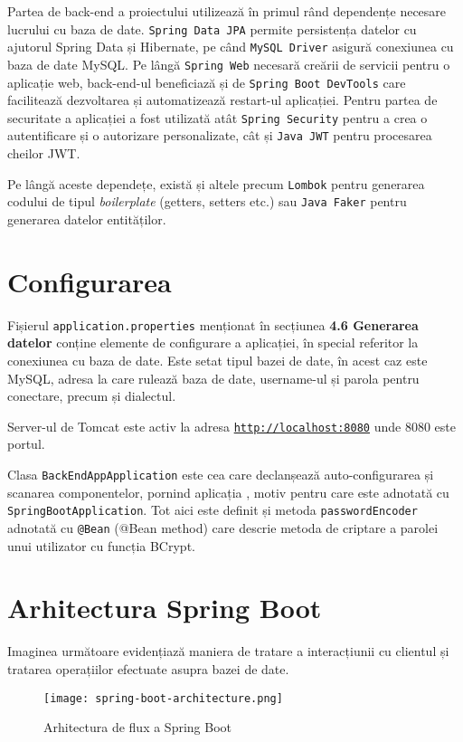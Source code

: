 Partea de back-end a proiectului \thesistitle{} utilizează în primul rând dependențe necesare lucrului cu baza de date. \texttt{Spring Data JPA} permite persistența datelor cu ajutorul Spring Data și Hibernate, pe când \texttt{MySQL Driver} asigură conexiunea cu baza de date MySQL. Pe lângă \texttt{Spring Web} necesară creării de servicii pentru o aplicație web, back-end-ul beneficiază și de \texttt{Spring Boot DevTools} care facilitează dezvoltarea și automatizează restart-ul aplicației. Pentru partea de securitate a aplicației a fost utilizată atât \texttt{Spring Security} pentru a crea o autentificare și o autorizare personalizate, cât și \texttt{Java JWT} pentru procesarea cheilor JWT.

Pe lângă aceste dependețe, există și altele precum \texttt{Lombok} pentru generarea codului de tipul \textit{boilerplate} (getters, setters etc.) sau \texttt{Java Faker} pentru generarea datelor entităților.

\section{Configurarea}

Fișierul \texttt{application.properties} menționat în secțiunea \textbf{4.6 Generarea datelor} conține elemente de configurare a aplicației, în special referitor la conexiunea cu baza de date. Este setat tipul bazei de date, în acest caz este MySQL, adresa la care rulează baza de date, username-ul și parola pentru conectare, precum și dialectul.

Server-ul de Tomcat este activ la adresa \texttt{\url{http://localhost:8080}} unde 8080 este portul.

Clasa \texttt{BackEndAppApplication} este cea care declanșează auto-configurarea și scanarea componentelor, pornind aplicația \cite{spring-boot-app-class}, motiv pentru care este adnotată cu \texttt{SpringBootApplication}. Tot aici este definit și metoda \texttt{passwordEncoder} adnotată cu \texttt{@Bean} (@Bean method) care descrie metoda de criptare a parolei unui utilizator cu funcția BCrypt.

\section{Arhitectura Spring Boot}

Imaginea următoare evidențiază maniera de tratare a interacțiunii cu clientul și tratarea operațiilor efectuate asupra bazei de date.

\begin{figure}[H]
	\centering
	\texttt{[image: spring-boot-architecture.png]}
	\caption{Arhitectura de flux a Spring Boot}
\end{figure}

